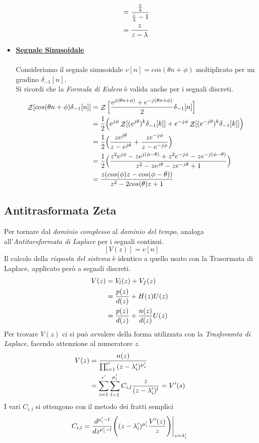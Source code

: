 \documentclass{article}
\newcommand{\Ztransf}{\mathop{\mathcal{Z}}}
\newcommand{\AntiZtransf}{\mathop{\mathcal{Z}^{-1}}}
\begin{document}
\begin{itemize}
\[\begin{aligned}
							&= {{{{z}\over{\lambda}}}\over{{{z}\over{\lambda}} - 1}} \\
					  		&= {{z}\over{z - \lambda}}
					  	\end{aligned}
					  \]
				\item \underline{\textbf{Segnale Sinusoidale}} \\
					  \\
					  Consideriamo il segnale sinusoidale $ v[n] = cos(\theta n + \phi) $ moltiplicato per un gradino $ \delta_{-1}[n] $. \\
					  Si ricordi che la \textit{Formula di Eulero} è valida anche per i segnali discreti.
					  \[
					  	\begin{aligned}
					  		\Ztransf[cos(\theta n + \phi)\delta_{-1}[n]] &= \Ztransf\Big[{{e^{j(\theta n + \phi)} + e^{-j(\theta n + \phi)}}\over{2}}\delta_{-1}[n]\Big] \\
							&= {{1}\over{2}} \Big( e^{j\phi} \Ztransf[(e^{j\theta})^k \delta_{-1}[k]] + e^{-j\phi} \Ztransf[(e^{-j\theta})^k \delta_{-1}[k]] \Big) \\
							&= {{1}\over{2}} \Big( {{ze^{j\theta}}\over{z - e^{j\theta}}} + {{ze^{-j\phi}}\over{z - e^{-j\phi}}} \Big) \\
							&= {{1}\over{2}} \Big( {{z^2 e^{j\phi} - ze^{j(\phi - \theta)} + z^2e^{-j\phi} - ze^{-j(\phi - \theta)}}\over{z^2 - ze^{j\theta} - ze^{-j\theta} + 1}} \Big) \\
							&= {{z(cos(\phi)z - cos(\phi - 	\theta))}\over{z^2 -2cos(\theta)z + 1}}
					  	\end{aligned}
					  \]
			\end{itemize}

		\subsection{Antitrasformata Zeta}
			Per tornare dal \textit{dominio complesso} al \textit{dominio del tempo}, analoga all'\textit{Antitarsformata di Laplace} per i segnali continui.
			\[
				\AntiZtransf[V(z)] = v[n]
			\]
			Il calcolo della \textit{risposta del sistema} è identico a quello usato con la Trasormata di Laplace, applicato però a segnali discreti.
			\[
				\begin{aligned}
					V(z) &= V_l(z) + V_f(z) \\
					&= {{p(z)}\over{d(z)}} + H(z)U(z) \\
					&= {{p(z)}\over{d(z)}} + {{n(z)}\over{d(z)}}U(z)
				\end{aligned}
			\]
			Per trovare $ V(z) $ ci si può avvalere della forma utilizzata con la \textit{Trasforamta di Laplace}, facendo attenzione al numeratore $ z $.
			\[
				\begin{aligned}
					V(z) &= {{n(z)}\over{\prod_{i=1}^{r'} {(z - \lambda'_{i})^{\mu'_i}}}} \\
					&= \sum_{i=1}^{r'} {\sum_{l=1}^{\mu'_i} {C_{i,l} {{z}\over{(z - \lambda'_{i})^{l}}}}} = V'(s)
				\end{aligned}
			\]
			I vari $ C_{i,l} $ si ottengono con il metodo dei fratti semplici
			\[
				C_{i,l} = {{d^{{\mu'_i}-l}}\over{dz^{{\mu'_i}-l}}} \Bigg( (z - \lambda'_{i})^{\mu'_i} {{V'(z)}\over{z}} \Bigg) \Bigg\vert_{z=\lambda'_i}
			\]
\end{document}
